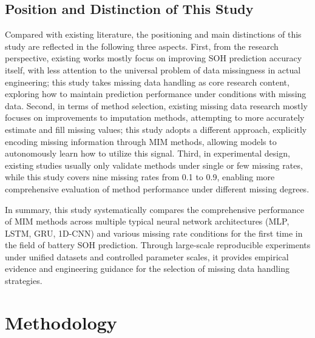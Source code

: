 \documentclass[10pt,a4paper]{article}
\begin{document}
\subsection{Position and Distinction of This Study}

Compared with existing literature, the positioning and main distinctions of this study are reflected in the following three aspects. First, from the research perspective, existing works mostly focus on improving SOH prediction accuracy itself, with less attention to the universal problem of data missingness in actual engineering; this study takes missing data handling as core research content, exploring how to maintain prediction performance under conditions with missing data. Second, in terms of method selection, existing missing data research mostly focuses on improvements to imputation methods, attempting to more accurately estimate and fill missing values; this study adopts a different approach, explicitly encoding missing information through MIM methods, allowing models to autonomously learn how to utilize this signal. Third, in experimental design, existing studies usually only validate methods under single or few missing rates, while this study covers nine missing rates from 0.1 to 0.9, enabling more comprehensive evaluation of method performance under different missing degrees.

In summary, this study systematically compares the comprehensive performance of MIM methods across multiple typical neural network architectures (MLP, LSTM, GRU, 1D-CNN) and various missing rate conditions for the first time in the field of battery SOH prediction. Through large-scale reproducible experiments under unified datasets and controlled parameter scales, it provides empirical evidence and engineering guidance for the selection of missing data handling strategies.

\section{Methodology}\label{sec:method}

\end{document}
